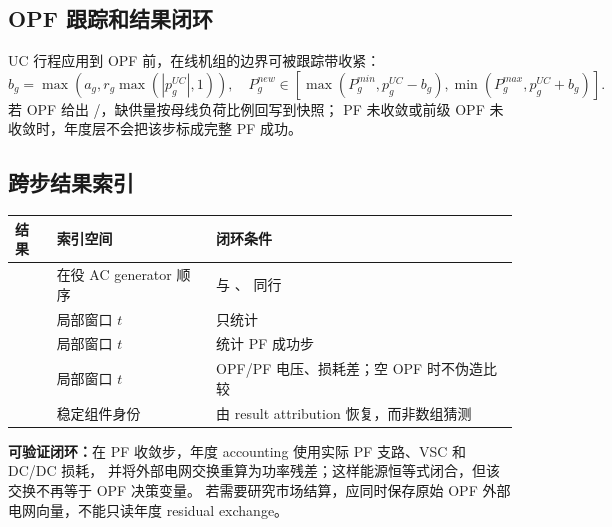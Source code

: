 \subsection{OPF 跟踪和结果闭环}
UC 行程应用到 OPF 前，在线机组的边界可被跟踪带收紧：
\[
b_g=\max(a_g,r_g\max(|p_g^{UC}|,1)),\quad
P_g^{new}\in[\max(P_g^{min},p_g^{UC}-b_g),\min(P_g^{max},p_g^{UC}+b_g)].
\]
若 OPF 给出 /，缺供量按母线负荷比例回写到快照；
PF 未收敛或前级 OPF 未收敛时，年度层不会把该步标成完整 PF 成功。

\subsection{跨步结果索引}
\begin{center}\footnotesize
\begin{tabular}{@{}L{4.2cm}L{3.1cm}L{5.9cm}@{}}
\toprule
结果 & 索引空间 & 闭环条件\\ \midrule
{} & 在役 AC generator 顺序 & 与 、 同行\\
 & 局部窗口 $t$ &  只统计 \\
 & 局部窗口 $t$ &  统计 PF 成功步\\
 & 局部窗口 $t$ & OPF/PF 电压、损耗差；空 OPF 时不伪造比较\\
 & 稳定组件身份 & 由 result attribution 恢复，而非数组猜测\\
\bottomrule
\end{tabular}
\end{center}

\begin{theorynote}
\textbf{可验证闭环：}在 PF 收敛步，年度 accounting 使用实际 PF 支路、VSC 和 DC/DC 损耗，
并将外部电网交换重算为功率残差；这样能源恒等式闭合，但该交换不再等于 OPF 决策变量。
若需要研究市场结算，应同时保存原始 OPF 外部电网向量，不能只读年度 residual exchange。
\end{theorynote}
